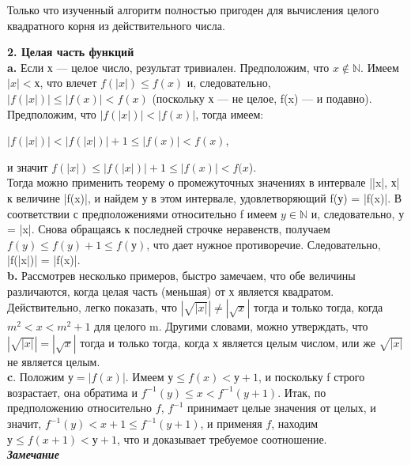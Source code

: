 \documentclass{mai_book}
\begin{document}
\begin{mynotice}
Только что изученный алгоритм полностью пригоден для вычисления целого квадратного корня из действительного числа.
\end{mynotice}
\newpage

\noindent
\textbf{2. Целая часть функций}\\

\textbf{a.} Если х — целое число, результат тривиален. Предположим, что $x\notin \mathbb{N}$. Имеем $|x| < х$, что влечет $f(|x|) \leqslant f(x)$ и, следовательно, $|f(|x|)| \leqslant |f(x)| < f(x)$ (поскольку х — не целое, f(x) — и подавно). Предположим, что $|f(|x|)| < |f(x)|$, тогда имеем:
\begin{center}
$|f(|x|)| < |f(|x|)| + 1 \leqslant |f(x)| < f(x)$,
\end{center}
\hspace*{100pt}и значит $f(|x|) \leqslant |f(|x|)| + 1 \leqslant |f(x)| < f(x$).\\

\noindent
Тогда можно применить теорему о промежуточных значениях в интервале ||x|, х| к величине |f(x)|, и найдем у в этом интервале, удовлетворяющий f(у) = |f(x)|. В соответствии с предположениями относительно f имеем $y \in \mathbb{N}$ и, следовательно, у = |x|. Снова обращаясь к последней строчке неравенств, получаем $f(y) \leqslant f(y) + 1 \leqslant f(у)$, что дает нужное противоречие. Следовательно, |f(|x|)| = |f(x)|.\\

\textbf{b.} Рассмотрев несколько примеров, быстро замечаем, что обе величины различаются, когда целая часть (меньшая) от х является квадратом. Действительно, легко показать, что $|\sqrt{|x|}| \neq |\sqrt{x}|$ тогда и только тогда, когда $m^{2} < x < m^{2} + 1$ для целого m. Другими словами, можно утверждать, что $|\sqrt{|x|}| = |\sqrt{x}|$ тогда и только тогда, когда х является целым числом, или же $\sqrt{|x|}$ не является целым.\\

\textbf{c}. Положим $у = |f(x)|$. Имеем $у \leqslant  f(x) < у + 1$, и поскольку f строго возрастает, она обратима и $f^{-1}(y) \leqslant x < f^{-1}(y + 1)$. Итак, по предположению относительно $f$, $f^{-1}$ принимает целые значения от целых, и значит, $f^{-1}(y) < x + 1 \leqslant f^{-1}(y + 1)$, и применяя $f$, находим $у \leqslant f(x+1) < у + 1$, что и доказывает требуемое соотношение.\\

\textit{\textbf{Замечание}}\\
\end{document}
